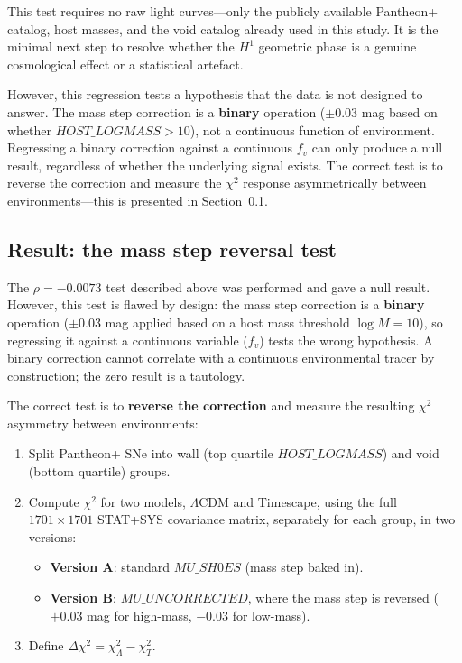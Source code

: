 \documentclass[11pt]{article}
\begin{document}
This test requires no raw light curves---only the publicly available
Pantheon+ catalog, host masses, and the void catalog already used
in this study. It is the minimal next step to resolve whether the
$H^1$ geometric phase is a genuine cosmological effect or a
statistical artefact.

However, this regression tests a hypothesis that the data is not
designed to answer. The mass step correction is a \textbf{binary}
operation ($\pm 0.03$ mag based on whether $HOST\_LOGMASS > 10$),
not a continuous function of environment. Regressing a binary
correction against a continuous $f_v$ can only produce a null
result, regardless of whether the underlying signal exists.
The correct test is to reverse the correction and measure the
$\chi^2$ response asymmetrically between environments---this
is presented in Section~\ref{sec:mass-step-result}.

\subsection{Result: the mass step reversal test}
\label{sec:mass-step-result}

The $\rho = -0.0073$ test described above was performed and gave a
null result. However, this test is flawed by design: the mass step
correction is a \textbf{binary} operation ($\pm 0.03$ mag applied
based on a host mass threshold $\log M = 10$), so regressing it
against a continuous variable ($f_v$) tests the wrong hypothesis.
A binary correction cannot correlate with a continuous environmental
tracer by construction; the zero result is a tautology.

The correct test is to \textbf{reverse the correction} and measure
the resulting $\chi^2$ asymmetry between environments:

\begin{enumerate}
  \item Split Pantheon+ SNe into wall (top quartile $HOST\_LOGMASS$)
    and void (bottom quartile) groups.
  \item Compute $\chi^2$ for two models, $\Lambda$CDM and Timescape,
    using the full $1701\times 1701$ STAT+SYS covariance matrix,
    separately for each group, in two versions:
  \begin{itemize}
    \item \textbf{Version A}: standard $MU\_SH0ES$ (mass step baked in).
    \item \textbf{Version B}: $MU\_UNCORRECTED$, where the mass step
      is reversed ($+0.03$ mag for high-mass, $-0.03$ for low-mass).
  \end{itemize}
  \item Define $\Delta\chi^2 = \chi^2_\Lambda - \chi^2_T$.
\end{enumerate}
\end{document}
